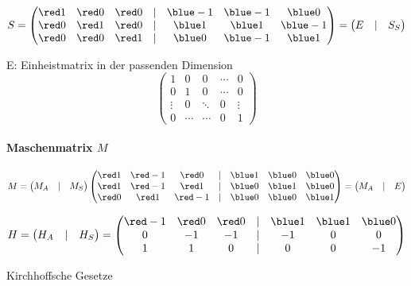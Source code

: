 \documentclass[german]{article}
\begin{document}
\[
	S =
	\begin{pmatrix}
		{\red 1} & {\red 0} & {\red 0} & | & {\blue -1} & {\blue -1} & {\blue 0} \\
		{\red 0} & {\red 1} & {\red 0} & | & {\blue 1} & {\blue 1} & {\blue -1} \\
		{\red 0} & {\red 0} & {\red 1} & | & {\blue 0} & {\blue -1} & {\blue 1}
	\end{pmatrix} =
	\begin{pmatrix}
		E & | & S_S
	\end{pmatrix}
\]

E: Einheistmatrix in der passenden Dimension
\[
	\begin{pmatrix}
		1 & 0 & 0 & \cdots & 0 \\
		0 & 1 & 0 & \cdots & 0 \\
		\vdots & 0 & \ddots & 0 & \vdots \\
		0 & \cdots & \cdots & 0 & 1
	\end{pmatrix}
\]

\paragraph{Maschenmatrix $M$}

\[
	M = \begin{pmatrix} M_A & | & M_S \end{pmatrix}
	\begin{pmatrix}
		{\red 1} & {\red -1} & {\red 0} & | & {\blue 1} & {\blue 0} & {\blue 0} \\
		{\red 1} & {\red -1} & {\red 1} & | & {\blue 0} & {\blue 1} & {\blue 0} \\
		{\red 0} & {\red 1} & {\red -1} & | & {\blue 0} & {\blue 0} & {\blue 1}
	\end{pmatrix} = \begin{pmatrix} M_A & | & E \end{pmatrix}
\]

\[
	H = \begin{pmatrix} H_A & | & H_S \end{pmatrix} =
	\begin{pmatrix}
		{\red -1} & {\red 0} & {\red 0} & | & {\blue 1} & {\blue 1} & {\blue 0} \\
		0 & -1 & -1 & | & -1 & 0 & 0 \\
		1 & 1 & 0 & | & 0 & 0 & -1 \\
	\end{pmatrix}
\]

Kirchhoffsche Gesetze
\end{document}
